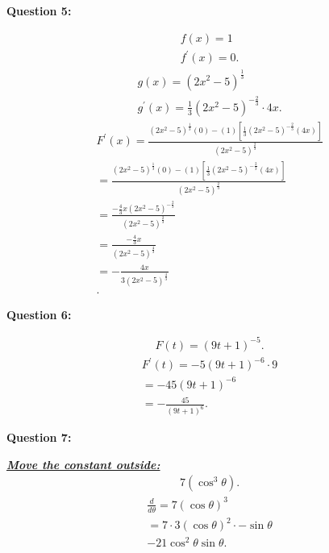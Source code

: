 \documentclass{report}
\begin{document}
    \bigbreak \noindent \bigbreak \noindent 
    \begin{Large}
        \textbf{Question 5:}
    \end{Large}
    \bigbreak \noindent 
    \bigbreak \noindent 
    \begin{align*}
        f(x) = 1 \\
        f^{\prime}(x) = 0 
    .\end{align*}
    \begin{align*}
        g(x) = (2x^2-5)^{\frac{1}{3}} \\
        g^{\prime}(x) = \frac{1}{3}(2x^{2}-5)^{-\frac{2}{3}} \cdot 4x
    .\end{align*}
    \begin{align*}
        F^{\prime}(x) = \frac{(2x^{2}-5)^{\frac{1}{3}}(0) - (1)[\frac{1}{3}(2x^{2}-5)^{-\frac{2}{3}}(4x)]}{(2x^{2}-5)^{\frac{2}{3}}} \\
        = \frac{(2x^{2}-5)^{\frac{1}{3}}(0) - (1)[\frac{1}{3}(2x^{2}-5)^{-\frac{2}{3}}(4x)]}{(2x^{2}-5)^{\frac{2}{3}}} \\
        = \frac{- \frac{4}{3}x(2x^{2}-5)^{-\frac{2}{3}}}{(2x^{2}-5)^{\frac{2}{3}}} \\ 
        = \frac{-\frac{4}{3}x}{(2x^{2}-5)^{\frac{4}{3}}} \\
        = -\frac{4x}{3(2x^{2}-5)^{\frac{4}{3}}} \\
    .\end{align*}

    \bigbreak \noindent \bigbreak \noindent 
    \begin{Large}
        \textbf{Question 6:}
    \end{Large}
    \bigbreak \noindent 
    \bigbreak \noindent 
    \begin{align*}
        F(t) = (9t+1)^{-5}
    .\end{align*}
    \begin{align*}
        F^{\prime}(t) = -5(9t+1)^{-6} \cdot 9 \\
        = -45(9t+1)^{-6} \\
        = -\frac{45}{(9t+1)^{6}}
    .\end{align*}

    \bigbreak \noindent \bigbreak \noindent 
    \begin{Large}
        \textbf{Question 7:}
    \end{Large}
    \bigbreak \noindent 
    \bigbreak \noindent 
    \textbf{\textit{\underline{Move the constant outside:}}}
    \begin{align*}
        7(\cos^{3}{\theta})
    .\end{align*}
    \begin{align*}
        \frac{d}{d\theta} = 7(\cos{\theta })^{3} \\
        = 7 \cdot 3(\cos{\theta })^{2} \cdot -\sin{\theta} \\
        -21\cos^{2}{\theta} \sin{\theta }
    .\end{align*}
\end{document}
